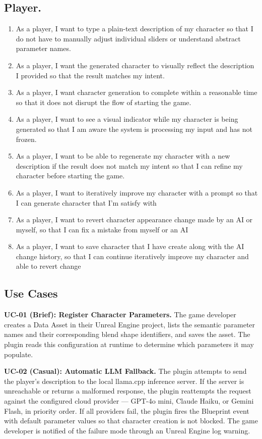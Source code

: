 \subsection{Player.}
\begin{enumerate}[label=\textbf{US-P-\arabic*.}, leftmargin=*, align=left]
    \item As a player, I want to type a plain-text description of my character so that I do not have to manually adjust individual sliders or understand abstract
    parameter names.
    \item As a player, I want the generated character to visually reflect the description I provided so that the result matches my intent.
    \item As a player, I want character generation to complete within a reasonable time so that it does not disrupt the flow of starting the game.
    \item As a player, I want to see a visual indicator while my character is being generated so that I am aware the system is processing my input and has not frozen.
    \item As a player, I want to be able to regenerate my character with a new description if the result does not match my intent so that I can refine my character before starting the game.
    \item As a player, I want to iteratively improve my character with a prompt so that I can generate character that I'm satisfy with
    \item As a player, I want to revert character appearance change made by an AI or myself, so that I can fix a mistake from myself or an AI
    \item As a player, I want to save character that I have create along with the AI change history, so that I can continue iteratively improve my character and able to revert change
\end{enumerate}

\subsection*{Use Cases}

\textbf{UC-01 (Brief): Register Character Parameters.}
The game developer creates a Data Asset in their Unreal Engine project, lists
the semantic parameter names and their corresponding blend shape identifiers,
and saves the asset. The plugin reads this configuration at runtime to determine
which parameters it may populate.

\textbf{UC-02 (Casual): Automatic LLM Fallback.}
The plugin attempts to send the player's description to the local llama.cpp
inference server. If the server is unreachable or returns a malformed response,
the plugin reattempts the request against the configured cloud provider — GPT-4o
mini, Claude Haiku, or Gemini Flash, in priority order. If all providers fail,
the plugin fires the Blueprint event with default parameter values so that
character creation is not blocked. The game developer is notified of the failure
mode through an Unreal Engine log warning.

